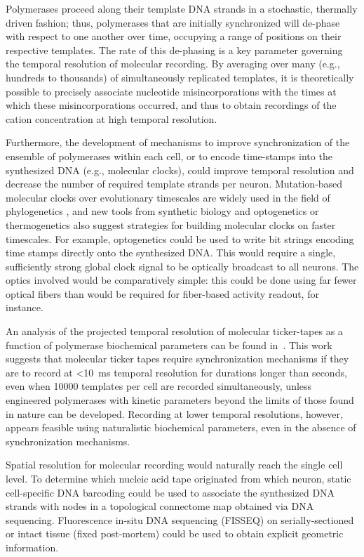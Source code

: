 Polymerases proceed along their template DNA strands in a stochastic, thermally driven fashion; thus, polymerases that are initially synchronized will de-phase with respect to one another over time, occupying a range of positions on their respective templates. The rate of this de-phasing is a key parameter governing the temporal resolution of molecular recording. By averaging over many (e.g., hundreds to thousands) of simultaneously replicated templates, it is theoretically possible to precisely associate nucleotide misincorporations with the times at which these misincorporations occurred, and thus to obtain recordings of the cation concentration at high temporal resolution. 

Furthermore, the development of mechanisms to improve synchronization of the ensemble of polymerases within each cell, or to encode time-stamps into the synthesized DNA (e.g., molecular clocks), could improve temporal resolution and decrease the number of required template strands per neuron. Mutation-based molecular clocks over evolutionary timescales are widely used in the field of phylogenetics \cite{Ochman1987}, and new tools from synthetic biology \cite{Elowitz2000} and optogenetics or thermogenetics \cite{Bernstein2012} also suggest strategies for building molecular clocks on faster timescales. For example, optogenetics could be used to write bit strings encoding time stamps directly onto the synthesized DNA. This would require a single, sufficiently strong global clock signal to be optically broadcast to all neurons. The optics involved would be comparatively simple: this could be done using far fewer optical fibers than would be required for fiber-based activity readout, for instance.

An analysis of the projected temporal resolution of molecular ticker-tapes as a function of polymerase biochemical parameters can be found in~\cite{glaser13}.
This work suggests that molecular ticker tapes require synchronization mechanisms if they are to record at \SI{<10}{\ms} temporal resolution for durations longer than seconds, even when \num{10000} templates per cell are recorded simultaneously, unless engineered polymerases with kinetic parameters beyond the limits of those found in nature can be developed.
Recording at lower temporal resolutions, however, appears feasible using naturalistic biochemical parameters, even in the absence of synchronization mechanisms.

Spatial resolution for molecular recording would naturally reach the single cell level. To determine which nucleic acid tape originated from which neuron, static cell-specific DNA barcoding could be used \cite{zador12} to associate the synthesized DNA strands with nodes in a topological connectome map obtained via DNA sequencing.  Fluorescence in-situ DNA sequencing (FISSEQ) on serially-sectioned or intact tissue (fixed post-mortem) \cite{chung2013structural} could be used to obtain explicit geometric information.

